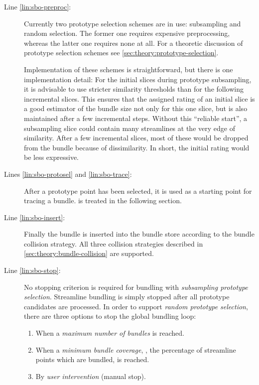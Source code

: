\begin{description}
%
	\item[Line \ref{lin:sbo-preproc}:] Currently two prototype selection schemes are in use: subsampling and random selection. The former one requires expensive preprocessing, whereas the latter one requires none at all. For a theoretic discussion of prototype selection schemes see \autoref{sec:theory:prototype-selection}.

Implementation of these schemes is straightforward, but there is one implementation detail: For the initial slices during prototype subsampling, it is advisable to use stricter similarity thresholds than for the following incremental slices. This ensures that the assigned rating of an initial slice is a good estimator of the bundle size not only for this one slice, but is also maintained after a few incremental steps. Without this ``reliable start'', a subsampling slice could contain many streamlines at the very edge of similarity. After a few incremental slices, most of these would be dropped from the bundle because of dissimilarity. In short, the initial rating would be less expressive.
%
	\item[Lines \ref{lin:sbo-protosel} and \ref{lin:sbo-trace}:] After a prototype point has been selected, it is used as a starting point for tracing a bundle.  is treated in the following section.
%
	\item[Line \ref{lin:sbo-insert}:] Finally the bundle is inserted into the bundle store according to the bundle collision strategy. All three collision strategies described in \autoref{sec:theory:bundle-collision} are supported.
%
	\item[Line \ref{lin:sbo-stop}:] No stopping criterion is required for bundling with \emph{subsampling prototype selection}. Streamline bundling is simply stopped after all prototype candidates are processed.
In order to support \emph{random prototype selection}, there are three options to stop the global bundling loop:
%
	\begin{enumerate}
	  \item When a \emph{maximum number of bundles} is reached.
	  \item When a \emph{minimum bundle coverage}, \ie, the percentage of streamline points which are bundled, is reached.
	  \item By \emph{user intervention} (manual stop).
	\end{enumerate}
%
\end{description}


